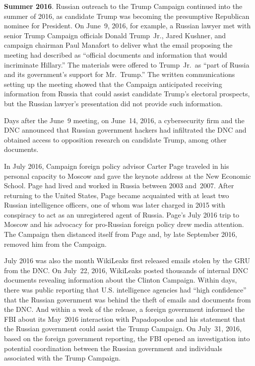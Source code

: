 \textbf{Summer 2016}.
Russian outreach to the Trump Campaign continued into the summer of 2016, as candidate Trump was becoming the presumptive Republican nominee for President.
On June~9, 2016, for example, a Russian lawyer met with senior Trump Campaign officials Donald Trump~Jr., Jared Kushner, and campaign chairman Paul Manafort to deliver what the email proposing the meeting had described as ``official documents and information that would incriminate Hillary.''
The materials were offered to Trump~Jr.\ as ``part of Russia and its government's support for Mr.~Trump.''
The written communications setting up the meeting showed that the Campaign anticipated receiving information from Russia that could assist candidate Trump's electoral prospects, but the Russian lawyer's presentation did not provide such information.

Days after the June~9 meeting, on June~14, 2016, a cybersecurity firm and the DNC announced that Russian government hackers had infiltrated the DNC and obtained access to opposition research on candidate Trump, among other documents.

In July 2016, Campaign foreign policy advisor Carter Page traveled in his personal capacity to Moscow and gave the keynote address at the New Economic School.
Page had lived and worked in Russia between 2003 and~2007.
After returning to the United States, Page became acquainted with at least two Russian intelligence officers, one of whom was later charged in 2015 with conspiracy to act as an unregistered agent of Russia.
Page's July 2016 trip to Moscow and his advocacy for pro-Russian foreign policy drew media attention.
The Campaign then distanced itself from Page and, by late September 2016, removed him from the Campaign.

July 2016 was also the month WikiLeaks first released emails stolen by the GRU from the DNC\null.
On July~22, 2016, WikiLeaks posted thousands of internal DNC documents revealing information about the Clinton Campaign.
Within days, there was public reporting that U.S. intelligence agencies had ``high confidence'' that the Russian government was behind the theft of emails and documents from the DNC\null.
And within a week of the release, a foreign government informed the FBI about its May~2016 interaction with Papadopoulos and his statement that the Russian government could assist the Trump Campaign.
On July~31, 2016, based on the foreign government reporting, the FBI opened an investigation into potential coordination between the Russian government and individuals associated with the Trump Campaign.

